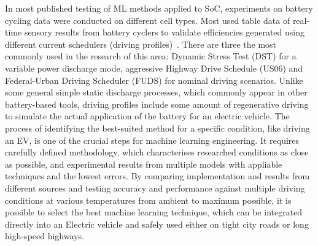 %
In most published testing of ML methods applied to SoC, experiments on battery cycling data were conducted on different cell types.
Most used table data of real-time sensory results from battery cyclers to validate efficiencies generated using different current schedulers (driving profiles)~\cite{Chemali2017,song_lithium-ion_2018,mamo_long_2020,jiao_gru-rnn_2020,xiao_accurate_2019}.
There are three the most commonly used in the research of this area: Dynamic Stress Test (DST) for a variable power discharge mode, aggressive Highway Drive Schedule (US06) and Federal-Urban Driving Scheduler (FUDS) for nominal driving scenarios.
Unlike some general simple static discharge processes, which commonly appear in other battery-based tools, driving profiles include some amount of regenerative driving to simulate the actual application of the battery for an electric vehicle.
%
%
The process of identifying the best-suited method for a specific condition, like driving an EV, is one of the crucial steps for machine learning engineering.
It requires carefully defined methodology, which characterises researched conditions as close as possible, and experimental results from multiple models with appliable techniques and the lowest errors.
By comparing implementation and results from different sources and testing accuracy and performance against multiple driving conditions at various temperatures from ambient to maximum possible, it is possible to select the best machine learning technique, which can be integrated directly into an Electric vehicle and safely used either on tight city roads or long high-speed highways.
